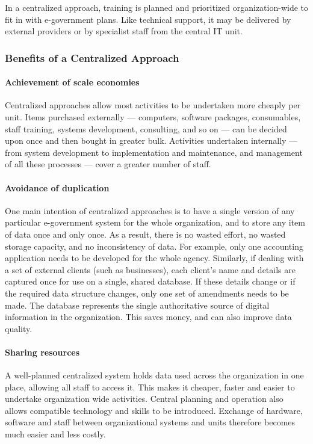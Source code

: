 In a centralized approach, training is planned and prioritized organization-wide to fit in with e-government plans. Like technical support, it may be delivered by external providers or by specialist staff from the central IT unit. 

\subsubsection{Benefits of a Centralized Approach}

\paragraph*{Achievement of scale economies}
Centralized approaches allow most activities to be undertaken more cheaply per unit. Items purchased externally — computers, software packages, consumables, staff training, systems development, consulting, and so on — can be decided upon once and then bought in greater bulk.
Activities undertaken internally — from system development to implementation
and maintenance, and management of all these processes — cover a greater number of staff.

\paragraph*{Avoidance of duplication}
One main intention of centralized approaches is to have a single version of any particular e-government system for the whole organization, and to store any item of data once and only once. As a result, there is no wasted effort, no wasted storage
capacity, and no inconsistency of data. For example, only one accounting application needs to be developed for the whole agency. Similarly, if dealing with a set of external clients (such as businesses), each client’s name and details are captured once for use on a single, shared database. If these details change or if the required data structure changes, only one set of amendments needs to be made. The database represents the single authoritative source of digital information in the organization. This saves money, and can also improve data quality.


\paragraph*{Sharing resources}
A well-planned centralized system holds data used across the organization in one place, allowing all staff to access it. This makes it cheaper, faster and easier to undertake organization wide activities. Central planning and operation also allows compatible technology and skills to be introduced. Exchange of hardware, software and staff between
organizational systems and units therefore becomes much easier and less costly.



